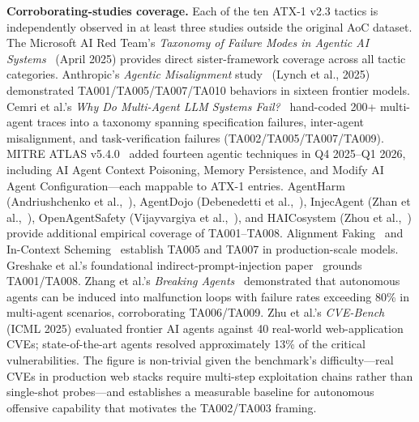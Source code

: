 \documentclass{IEEEoj-data}
\newcommand{\added}[1]{#1}
\begin{document}
\added{{\bf Corroborating-studies coverage.} Each of the ten ATX-1 v2.3 tactics is independently observed in at least three studies outside the original AoC dataset. The Microsoft AI Red Team's {\it Taxonomy of Failure Modes in Agentic AI Systems}~\mbox{\cite{ref17}} (April 2025) provides direct sister-framework coverage across all tactic categories. Anthropic's {\it Agentic Misalignment} study~\mbox{\cite{ref18}} (Lynch et al., 2025) demonstrated TA001/TA005/TA007/TA010 behaviors in sixteen frontier models. Cemri et al.'s {\it Why Do Multi-Agent LLM Systems Fail?}~\mbox{\cite{ref19}} hand-coded 200+ multi-agent traces into a taxonomy spanning specification failures, inter-agent misalignment, and task-verification failures (TA002/TA005/TA007/TA009). MITRE ATLAS v5.4.0~\mbox{\cite{ref3}} added fourteen agentic techniques in Q4 2025--Q1 2026, including AI Agent Context Poisoning, Memory Persistence, and Modify AI Agent Configuration---each mappable to ATX-1 entries. AgentHarm (Andriushchenko et al.,~\mbox{\cite{ref20}}), AgentDojo (Debenedetti et al.,~\mbox{\cite{ref21}}), InjecAgent (Zhan et al.,~\mbox{\cite{ref22}}), OpenAgentSafety (Vijayvargiya et al.,~\mbox{\cite{ref23}}), and HAICosystem (Zhou et al.,~\mbox{\cite{ref24}}) provide additional empirical coverage of TA001--TA008. Alignment Faking~\mbox{\cite{ref25}} and In-Context Scheming~\mbox{\cite{ref26}} establish TA005 and TA007 in production-scale models. Greshake et al.'s foundational indirect-prompt-injection paper~\mbox{\cite{ref27}} grounds TA001/TA008. Zhang et al.'s {\it Breaking Agents}~\mbox{\cite{ref31}} demonstrated that autonomous agents can be induced into malfunction loops with failure rates exceeding 80\% in multi-agent scenarios, corroborating TA006/TA009. Zhu et al.'s {\it CVE-Bench}~\mbox{\cite{ref32}} (ICML 2025) evaluated frontier AI agents against 40 real-world web-application CVEs; state-of-the-art agents resolved approximately 13\% of the critical vulnerabilities. The figure is non-trivial given the benchmark's difficulty---real CVEs in production web stacks require multi-step exploitation chains rather than single-shot probes---and establishes a measurable baseline for autonomous offensive capability that motivates the TA002/TA003 framing.}
\end{document}
